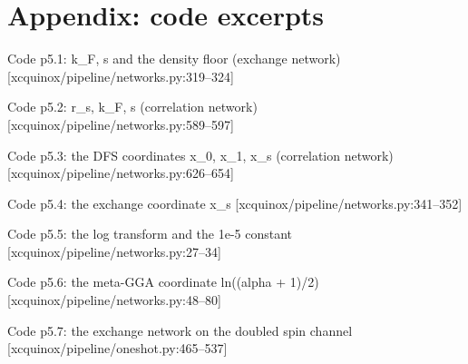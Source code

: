 \section*{Appendix: code excerpts}
\begin{frame}[allowframebreaks]{Code p5.1: k\_F, s and the density floor (exchange network) [xcquinox/pipeline/networks.py:319--324]}
\label{code:p5_1_k_f_s_and_the_density_floor_exchange_net}
\end{frame}
\begin{frame}[allowframebreaks]{Code p5.2: r\_s, k\_F, s (correlation network) [xcquinox/pipeline/networks.py:589--597]}
\label{code:p5_2_r_s_k_f_s_correlation_network}
\end{frame}
\begin{frame}[allowframebreaks]{Code p5.3: the DFS coordinates x\_0, x\_1, x\_s (correlation network) [xcquinox/pipeline/networks.py:626--654]}
\label{code:p5_3_the_dfs_coordinates_x_0_x_1_x_s_correlat}
\end{frame}
\begin{frame}[allowframebreaks]{Code p5.4: the exchange coordinate x\_s [xcquinox/pipeline/networks.py:341--352]}
\label{code:p5_4_the_exchange_coordinate_x_s}
\end{frame}
\begin{frame}[allowframebreaks]{Code p5.5: the log transform and the 1e-5 constant [xcquinox/pipeline/networks.py:27--34]}
\label{code:p5_5_the_log_transform_and_the_1e_5_constant}
\end{frame}
\begin{frame}[allowframebreaks]{Code p5.6: the meta-GGA coordinate ln((alpha + 1)/2) [xcquinox/pipeline/networks.py:48--80]}
\label{code:p5_6_the_meta_gga_coordinate_ln_alpha_1_2}
\end{frame}
\begin{frame}[allowframebreaks]{Code p5.7: the exchange network on the doubled spin channel [xcquinox/pipeline/oneshot.py:465--537]}
\label{code:p5_7_the_exchange_network_on_the_doubled_spin}
\end{frame}
